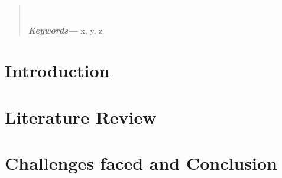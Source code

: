\documentclass[12 pt, a4paper]{report}
\providecommand{\keywords}[1]
{
  \small	
  \textbf{\textit{Keywords---}} #1
}
\begin{document}


\onehalfspacing
{}
\begin{abstract}
\lipsum[1]
\\[0.5 cm]
\centerline{\keywords{x, y, z}}

\end{abstract}

\tableofcontents
\pagebreak

{}
\section{Introduction}
\lipsum[1]


\section{Literature Review}
\label{sec:review}
\lipsum[1]

\section{Challenges faced and Conclusion}
\lipsum[1]

\singlespacing


\end{document}
